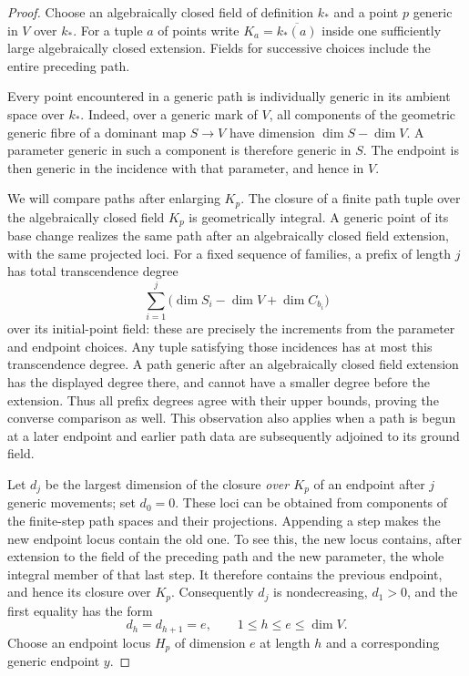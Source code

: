 \begin{proof}
Choose an algebraically closed field of definition $k_*$ and a point $p$ generic in $V$ over $k_*$.  For a tuple
$a$ of points write $K_a=\overline{k_*(a)}$ inside one sufficiently large
algebraically closed extension.  Fields for successive choices include
the entire preceding path.

Every point encountered in a generic path is individually generic in
its ambient space over $k_*$.  Indeed, over a generic mark of $V$, all
components of the geometric generic fibre of a dominant map $S\to V$
have dimension $\dim S-\dim V$.  A parameter generic in such a component
is therefore generic in $S$.  The endpoint is then generic in the
incidence with that parameter, and hence in $V$.

We will compare paths after enlarging $K_p$.  The closure of a finite
path tuple over the algebraically closed field $K_p$ is geometrically
integral.  A generic point of its base change realizes the same path
after an algebraically closed field extension, with the same projected
loci.  For a fixed sequence of families, a prefix of length $j$ has total
transcendence degree
\[
 \sum_{i=1}^j
 \bigl(\dim S_i-\dim V+\dim C_{b_i}\bigr)
\]
over its initial-point field: these are precisely the increments from
the parameter and endpoint choices.  Any tuple satisfying those
incidences has at most this transcendence degree.  A path generic after
an algebraically closed field extension has the displayed degree there,
and cannot have a smaller degree before the extension.  Thus all prefix
degrees agree with their upper bounds, proving the converse comparison
as well.  This observation also applies when a path is begun at a later
endpoint and earlier path data are subsequently adjoined to its ground
field.

Let $d_j$ be the largest dimension of the closure \emph{over $K_p$} of
an endpoint after $j$ generic movements; set $d_0=0$.  These loci can be
obtained from components of the finite-step path spaces and their
projections.  Appending a step makes the new endpoint locus contain the
old one.  To see this, the new locus contains, after extension to the
field of the preceding path and the new parameter, the whole integral
member of that last step.  It therefore contains the previous endpoint,
and hence its closure over $K_p$.  Consequently $d_j$ is nondecreasing,
$d_1>0$, and the first equality has the form
\[
 d_h=d_{h+1}=e,\qquad 1\le h\le e\le\dim V.
\]
Choose an endpoint locus $H_p$ of dimension $e$ at length $h$ and a
corresponding generic endpoint $y$.


\end{proof}
